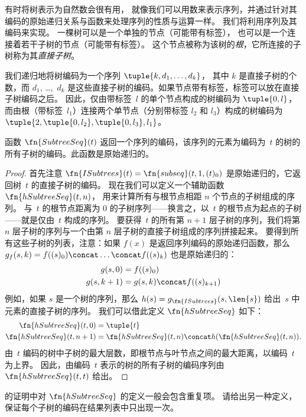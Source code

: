 \documentclass[../../../include/open-logic-section]{subfiles}
\begin{document}

有时将树表示为自然数会很有用，
就像我们可以用数来表示序列，并通过针对其编码的原始递归关系与函数来处理序列的性质与运算一样。
我们将利用序列及其编码来实现。
一棵树可以是一个单独的节点（可能带有标签），
也可以是一个连接着若干子树的节点（可能带有标签）。
这个节点被称为该树的\emph{根}，它所连接的子树称为其\emph{直接子树}。

我们递归地将树编码为一个序列 $\tuple{k, d_1, \dots, d_k}$，
其中 $k$ 是直接子树的个数，而 $d_1$, \dots,~$d_k$
是这些直接子树的编码。如果节点带有标签，标签可以放在直接子树编码之后。
因此，仅由带标签~$l$ 的单个节点构成的树编码为 $\tuple{0,l}$，
而由根（带标签~$l_1$）连接两个单节点（分别带标签 $l_2$ 和 $l_3$）构成的树编码为 $\tuple{2,
  \tuple{0, l_2}, \tuple{0, l_3}, l_1}$。

\begin{prop}
  函数 $\fn{SubtreeSeq}(t)$ 返回一个序列的编码，该序列的元素为编码为~$t$ 的树的所有子树的编码。此函数是原始递归的。
\end{prop}

\begin{proof}
  首先注意 $\fn{ISubtrees}(t) = \fn{subseq}(t, 1, (t)_0)$ 是原始递归的，它返回树~$t$ 的直接子树的编码。
  现在我们可以定义一个辅助函数 $\fn{hSubtreeSeq}(t,n)$，
  用来计算所有与根节点相距 $n$ 个节点的子树组成的序列。
  与~$t$ 的根节点距离为 $0$ 的子树序列——换言之，以~$t$ 的根节点为起点的子树——就是仅由~$t$ 构成的序列。
  要获得~$t$ 的所有第 $n+1$ 层子树的序列，我们将第 $n$ 层子树的序列与一个由第 $n$ 层子树的直接子树组成的序列拼接起来。
  要得到所有这些子树的列表，注意：如果 $f(x)$ 是返回序列编码的原始递归函数，那么 $g_f(s, k) = f((s)_0) \concat
  \dots \concat f((s)_k)$ 也是原始递归的：
    \begin{align*}
      g(s, 0) & = f((s)_0)\\
      g(s, k+1) & = g(s, k) \concat f((s)_{k+1})
    \end{align*}
    例如，如果 $s$ 是一个树的序列，那么
    $h(s) = g_{\fn{ISubtrees}}(s, \len{s})$ 给出~$s$ 中元素的直接子树的序列。
    我们可以借此定义 $\fn{hSubtreeSeq}$ 如下：
    \begin{align*}
      \fn{hSubtreeSeq}(t, 0) & = \tuple{t} \\
      \fn{hSubtreeSeq}(t, n+1) & = \fn{hSubtreeSeq}(t, n) \concat
      h(\fn{hSubtreeSeq}(t, n)).
    \end{align*}
    由~$t$ 编码的树中子树的最大层数，即根节点与叶节点之间的最大距离，以编码~$t$ 为上界。
    因此，由编码~$t$ 表示的树的所有子树的编码序列由 $\fn{hSubtreeSeq}(t, t)$ 给出。
\end{proof}

\begin{prob}
   的证明中对 $\fn{hSubtreeSeq}$ 的定义一般会包含重复项。
  请给出另一种定义，保证每个子树的编码在结果列表中只出现一次。
\end{prob}
\end{document}
